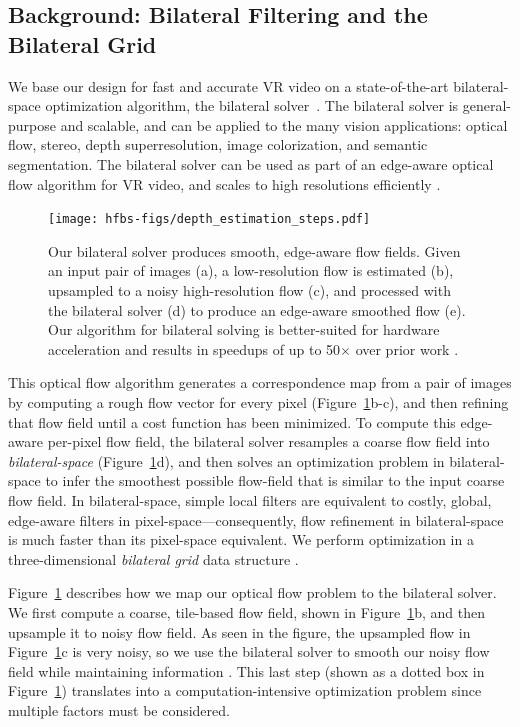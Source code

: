 \subsection{Background: Bilateral Filtering and the Bilateral Grid}

\label{sec:hfbs-background}

We base our design for fast and accurate VR video on a state-of-the-art bilateral-space optimization algorithm, the bilateral solver~\cite{BarronPoole2016}. 
The bilateral solver is general-purpose and scalable, and can be applied to the many vision applications: optical flow, stereo, depth superresolution, image colorization, and semantic segmentation.
The bilateral solver can be used as part of an edge-aware optical flow algorithm for VR video, and scales to high resolutions efficiently \cite{googlejump}.

  \begin{figure}[h]
		\centering
		\texttt{[image: hfbs-figs/depth\_estimation\_steps.pdf]}
		\caption{Our bilateral solver produces smooth, edge-aware flow fields.  Given an input pair of images (a), a low-resolution flow is estimated (b),  upsampled to a noisy high-resolution flow (c), and processed with the bilateral solver (d)  to produce an edge-aware smoothed flow (e). Our algorithm for bilateral solving is better-suited for hardware acceleration and results in speedups of up to 50$\times$ over prior work \cite{googlejump, BarronPoole2016}.}
		\label{fig:teaser}
  \end{figure}

This optical flow algorithm generates a correspondence map from a pair of images by computing a rough flow vector for every pixel (Figure~\ref{fig:teaser}b-c), and then refining that flow field until a cost function has been minimized. 
To compute this edge-aware per-pixel flow field, the bilateral solver resamples a coarse flow field into \emph{bilateral-space} (Figure~\ref{fig:teaser}d), and then solves an optimization problem in bilateral-space to infer the smoothest possible flow-field that is similar to the input coarse flow field. 
In bilateral-space, simple local filters are equivalent to costly, global, edge-aware filters in pixel-space---consequently, flow refinement in bilateral-space is much faster than its pixel-space equivalent.
We perform optimization in a three-dimensional \emph{bilateral grid} data structure \cite{Chen2007}. 

Figure~\ref{fig:teaser} describes how we map our optical flow problem to the bilateral solver. We first compute a coarse, tile-based flow field, shown in Figure~\ref{fig:teaser}b, and then upsample it to noisy flow field. As seen in the figure, the upsampled flow in Figure~\ref{fig:teaser}c is very noisy, so we use the bilateral solver to smooth our noisy flow field while maintaining information . This last step (shown as a dotted box in Figure~\ref{fig:teaser}) translates into a computation-intensive optimization problem since multiple factors must be considered. 

